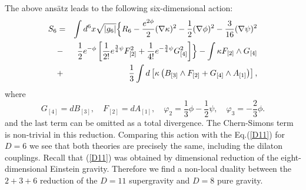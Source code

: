 \documentclass[a4paper,12pt]{article}
\begin{document}
The above ans\"atz leads to the following six-dimensional action:
\begin{eqnarray}
S_{6} &=& \int d^6x \sqrt{|g_{6}|} \Bigl\{ R_{6} -
\frac{e^{2\phi}}2 (\nabla\kappa)^2 - \frac12 (\nabla\phi)^2
- \frac3{16} (\nabla\psi)^2 \nonumber\\
&-& \frac12 e^{-\phi} \left[ \frac1{2!} e^{\frac34 \psi}F^2_{[2]}
+ \frac1{4!} e^{-\frac34 \psi} G^2_{[4]} \right] \Bigr\}
- \int \kappa F_{[2]} \wedge G_{[4]} \nonumber \\
&+& \frac13 \int d \left[ \kappa \left( B_{[3]} \wedge F_{[2]} +
G_{[4]} \wedge A_{[1]} \right) \right],
\end{eqnarray}
where
\begin{equation}\label{vp}
G_{[4]}=dB_{[3]},\quad F_{[2]}=dA_{[1]},\quad
\varphi_2 = \frac13 \phi - \frac12 \psi, \quad \varphi_3 = -
\frac23 \phi.
\end{equation}
and the last term can be omitted as a total divergence. The
Chern-Simons term is non-trivial in this reduction. Comparing
this action with the Eq.(\ref{D11}) for $D=6$ we see that both
theories are precisely the same, including the dilaton
couplings. Recall that (\ref{D11}) was obtained by dimensional
reduction of the eight-dimensional Einstein gravity. Therefore
we find a non-local duality between the $2+3+6$ reduction of the
$D=11$ supergravity and $D=8$ pure gravity.
\end{document}
